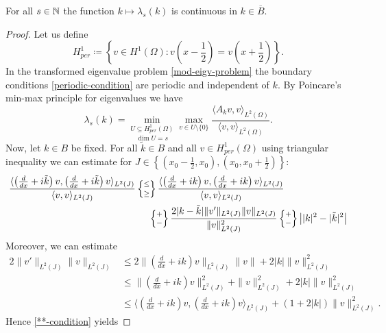 \begin{theorem}
	For all $s \in \mathbb{N}$ the function $k \mapsto \lambda_{s}(k)$ is continuous in $k \in \overline{B}$.
	
	\begin{proof}
		Let us define 
		$$H^{1}_{per} \coloneqq \left\{ 	v \in H^{1}(\Omega) : v\left(x - \frac{1}{2}\right) = v\left(x + \frac{1}{2}\right) \right\}. $$
		In the transformed eigenvalue problem \eqref{mod-eigv-problem} the boundary conditions \eqref{periodic-condition} are periodic and independent of $k$. By Poincare's min-max principle for eigenvalues we have
		\[ \lambda_{s}(k) = \underset{\dim U = s}{\min_{U \subseteq H^{1}_{per}(\Omega)}} \max_{v \in U \setminus \{ 0 \} } \frac{\langle A_{k} v, v \rangle_{L^{2}(\Omega)}}{\langle v, v \rangle_{L^{2}(\Omega)}}.  \] 
		Now, let $k \in B$ be fixed. For all $\tilde{k} \in B$ and all $v \in H^{1}_{per}(\Omega)$ using triangular inequality we can estimate for $J \in \left\{ (x_{0} - \frac{1}{2}, x_{0}), (x_{0}, x_{0} + \frac{1}{2}) \right\}$:
		\begin{align}
			 \frac{ \langle \left( \frac{d}{dx} + i\tilde{k} \right) v , \left( \frac{d}{dx} + i\tilde{k} \right) v \rangle_{L^{2}(J)}}{\langle v , v \rangle_{L^{2}(J)}} & \left\{\mathrel{\substack{\leq \\[0.1cm] \geq}}\right\} \frac{ \langle \left( \frac{d}{dx} + ik \right) v , \left( \frac{d}{dx} + ik \right) v \rangle_{L^{2}(J)}}{\langle v , v \rangle_{L^{2}(J)}} \notag \\
			& ~\quad \left\{\mathrel{\substack{+ \\[0.1cm] -}}\right\} \frac{2 |k-\tilde{k}|\|v'\|_{L^{2}(J)} \| v \|_{L^{2}(J)}}{\| v \|^{2}_{L^{2}(J)}} \left\{\mathrel{\substack{+ \\[0.1cm] -}}\right\} \left| |k|^{2} - |\tilde{k}|^{2} \right| \label{**-condition}
		\end{align}
		Moreover, we can estimate
		\begin{align*}
			2 \| v' \|_{L^{2}(J)} \| v \|_{L^{2}(J)} & \leq 2 \| \left( \frac{d}{dx} + ik \right) v\|_{L^{2}(J)} \| v \| + 2|k| \|v\|^{2}_{L^{2}(J)} \\
			& \leq \| \left( \frac{d}{dx} + ik \right) v \|^{2}_{L^{2}(J)} + \| v \|^{2}_{L^{2}(J)} + 2 |k| \| v \|^{2}_{L^{2}(J)} \\
			& \leq \langle  \left( \frac{d}{dx} + ik \right) v,  \left( \frac{d}{dx} + ik \right) v \rangle_{L^{2}(J)} + (1 + 2|k|) \|v\|^{2}_{L^{2}(J)}.
		\end{align*}
		Hence \eqref{**-condition} yields

\end{proof}
\end{theorem}
